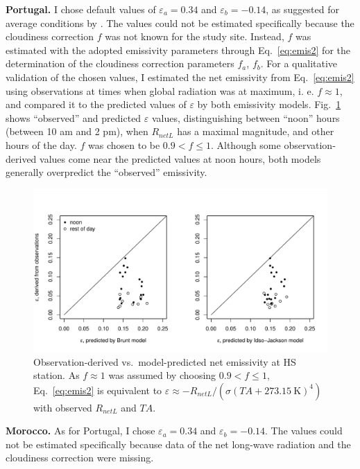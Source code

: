 \documentclass{scrreprt}
\begin{document}
\noindent
\textbf{Portugal.}
I chose default values of $\varepsilon_a = 0.34$ and $\varepsilon_b = -0.14$, as suggested for average conditions by \citet{maidment93}.
The values could not be estimated specifically because the cloudiness correction $f$ was not known for the study site.
Instead, $f$ was estimated with the adopted emissivity parameters through Eq.~\eqref{eq:emis2} for the determination of the cloudiness correction parameters $f_a$, $f_b$.
For a qualitative validation of the chosen values, I estimated the net emissivity from Eq.~\eqref{eq:emis2} using observations at times when global radiation was at maximum, i. e. $f \approx 1$, and compared it to the predicted values of $\varepsilon$ by both emissivity models.
Fig.~\ref{fig:portugal_emis_both} shows ``observed'' and predicted $\varepsilon$ values, distinguishing between ``noon'' hours (between 10 am and 2 pm), when $R_{netL}$ has a maximal magnitude, and other hours of the day.
$f$ was chosen to be $0.9 < f \leq 1$.
Although some observation-derived values come near the predicted values at noon hours, both models generally overpredict the ``observed'' emissivity.

\begin{figure}[ht]
  \centering
  \includegraphics[width=0.8\hsize]{./fig/plot_emis_both_HS.pdf}
  \caption{Observation-derived vs.\ model-predicted net emissivity at HS station.
           As $f \approx 1$ was assumed by choosing $0.9 < f \leq 1$, Eq.~\eqref{eq:emis2} is equivalent to $\varepsilon \approx - R_{netL} / (\sigma (TA + 273.15~\text{K})^4)$ with observed $R_{netL}$ and $TA$.}
  \label{fig:portugal_emis_both}
\end{figure}

\noindent
\textbf{Morocco.}
As for Portugal, I chose $\varepsilon_a = 0.34$ and $\varepsilon_b = -0.14$.
The values could not be estimated specifically because data of the net long-wave radiation and the cloudiness correction were missing.
\end{document}
